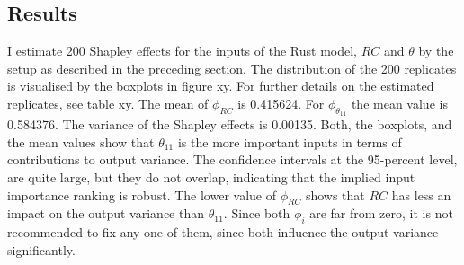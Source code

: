 \subsection{Results}

I estimate 200 Shapley effects for the inputs of the Rust model, $RC$ and $\theta$ by the setup as described in the preceding section. The distribution of the 200 replicates is visualised by the boxplots in figure xy. For further details on the estimated replicates, see table xy. The mean of $\phi_{RC}$ is 0.415624. For $\phi_{\theta_{11}}$ the mean value is 0.584376. The variance of the Shapley effects is 0.00135.
Both, the boxplots, and the mean values show that $\theta_{11}$ is the more important inputs in terms of contributions to output variance. The confidence intervals at the 95-percent level, are quite large, but they do not overlap, indicating that the implied input importance ranking is robust. The lower value of $\phi_{RC}$ shows that $RC$ has less an impact on the output variance than $\theta_{11}$. Since both $\phi_i$ are far from zero, it is not recommended to fix any one of them, since both influence the output variance significantly.
